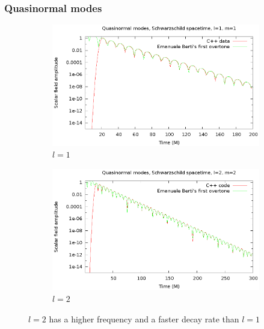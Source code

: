 \documentclass{beamer}
\begin{document}
\begin{frame}
  \frametitle{Quasinormal modes}
  \begin{figure}
    \centering
    \begin{subfigure}{.45\textwidth}
      \centering
      \includegraphics[width=\textwidth]{l1m1qnm}
      \caption{$l=1$}
    \end{subfigure}
    \begin{subfigure}{.45\textwidth}
      \centering
      \includegraphics[width=\textwidth]{l2m2qnm}
      \caption{$l=2$}
    \end{subfigure}
  \caption{$l=2$ has a higher frequency and a faster decay rate than $l=1$}
  \end{figure}
\end{frame}
\end{document}
